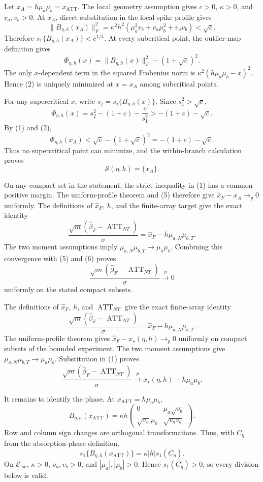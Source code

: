 Let \(x_A=h\mu_a\mu_b=x_{\operatorname{ATT}}\).  The local geometry assumption gives \(c>0\), \(\kappa>0\), and \(v_a,v_b>0\).  At \(x_A\), direct substitution in the local-spike profile gives
\[
 \|B_{\eta,h}(x_A)\|_F^2
 =\kappa^2h^2(\mu_a^2v_b+v_a\mu_b^2+v_av_b)<\sqrt c. \tag{1}
\]
Therefore \(s_1\{B_{\eta,h}(x_A)\}<c^{1/4}\).  At every subcritical point, the outlier-map definition gives
\[
 \Phi_{\eta,h}(x)=\|B_{\eta,h}(x)\|_F^2-(1+\sqrt c)^2. \tag{2}
\]
The only \(x\)-dependent term in the squared Frobenius norm is
\(\kappa^2(h\mu_a\mu_b-x)^2\).  Hence (2) is uniquely minimized at \(x=x_A\) among subcritical points.

For any supercritical \(x\), write \(s_j=s_j\{B_{\eta,h}(x)\}\).  Since \(s_1^2>\sqrt c\),
\[
 \Phi_{\eta,h}(x)
 =s_2^2-(1+c)-\frac c{s_1^2}
 >-(1+c)-\sqrt c. \tag{3}
\]
By (1) and (2),
\[
 \Phi_{\eta,h}(x_A)
 <\sqrt c-(1+\sqrt c)^2
 =-(1+c)-\sqrt c. \tag{4}
\]
Thus no supercritical point can minimize, and the within-branch calculation proves
\[
 \mathcal S(\eta,h)=\{x_A\}. \tag{5}
\]

On any compact set in the statement, the strict inequality in (1) has a common positive margin.  The uniform-profile theorem and (5) therefore give \(\widehat x_F-x_A\to_p0\) uniformly.  The definitions of \(\widehat x_F\), \(h\), and the finite-array target give the exact identity
\[
 \frac{\sqrt m(\widehat\beta_F-\operatorname{ATT}_{NT})}{\sigma}
 =\widehat x_F-h\mu_{a,N}\mu_{b,T}. \tag{6}
\]
The two moment assumptions imply
\(\mu_{a,N}\mu_{b,T}\to\mu_a\mu_b\).  Combining this convergence with (5) and (6) proves
\[
 \frac{\sqrt m(\widehat\beta_F-\operatorname{ATT}_{NT})}{\sigma}\xrightarrow{p}0
\]
uniformly on the stated compact subsets.

The definitions of \(\widehat x_F\), \(h\), and \(\operatorname{ATT}_{NT}\) give the exact finite-array identity
\[
 \frac{\sqrt m(\widehat\beta_F-\operatorname{ATT}_{NT})}{\sigma}
 =\widehat x_F-h\mu_{a,N}\mu_{b,T}. \tag{1}
\]
The uniform-profile theorem gives
\(\widehat x_F-x_\star(\eta,h)\to_p0\) uniformly on compact subsets of the bounded experiment.  The two moment assumptions give
\(\mu_{a,N}\mu_{b,T}\to\mu_a\mu_b\).  Substitution in (1) proves
\[
 \frac{\sqrt m(\widehat\beta_F-\operatorname{ATT}_{NT})}{\sigma}
 \xrightarrow{p}x_\star(\eta,h)-h\mu_a\mu_b. \tag{2}
\]

It remains to identify the phase.  At
\(x_{\operatorname{ATT}}=h\mu_a\mu_b\),
\[
 B_{\eta,h}(x_{\operatorname{ATT}})
 =\kappa h
 \begin{pmatrix}
 0&\mu_a\sqrt{v_b}\\
 \sqrt{v_a}\mu_b&\sqrt{v_av_b}
 \end{pmatrix}. \tag{3}
\]
Row and column sign changes are orthogonal transformations.  Thus, with \(C_\eta\) from the absorption-phase definition,
\[
 s_1\{B_{\eta,h}(x_{\operatorname{ATT}})\}
 =\kappa|h|s_1(C_\eta). \tag{4}
\]
On \(\mathcal E_{\mathrm{loc}}\), \(\kappa>0\), \(v_a,v_b>0\), and \(|\mu_a|,|\mu_b|>0\).  Hence \(s_1(C_\eta)>0\), so every division below is valid.

